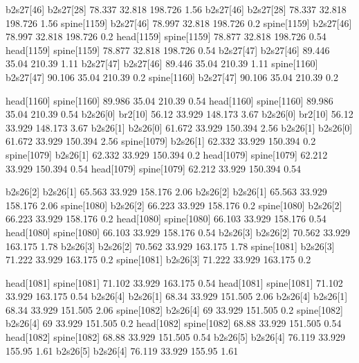 b2s27[46]    b2s27[28]    78.337    32.818    198.726    1.56
b2s27[46]    b2s27[28]    78.337    32.818    198.726    1.56
spine[1159]    b2s27[46]    78.997    32.818    198.726    0.2
spine[1159]    b2s27[46]    78.997    32.818    198.726    0.2
head[1159]    spine[1159]    78.877    32.818    198.726    0.54
head[1159]    spine[1159]    78.877    32.818    198.726    0.54
b2s27[47]    b2s27[46]    89.446    35.04    210.39    1.11
b2s27[47]    b2s27[46]    89.446    35.04    210.39    1.11
spine[1160]    b2s27[47]    90.106    35.04    210.39    0.2
spine[1160]    b2s27[47]    90.106    35.04    210.39    0.2


head[1160]    spine[1160]    89.986    35.04    210.39    0.54
head[1160]    spine[1160]    89.986    35.04    210.39    0.54
b2s26[0]    br2[10]    56.12    33.929    148.173    3.67
b2s26[0]    br2[10]    56.12    33.929    148.173    3.67
b2s26[1]    b2s26[0]    61.672    33.929    150.394    2.56
b2s26[1]    b2s26[0]    61.672    33.929    150.394    2.56
spine[1079]    b2s26[1]    62.332    33.929    150.394    0.2
spine[1079]    b2s26[1]    62.332    33.929    150.394    0.2
head[1079]    spine[1079]    62.212    33.929    150.394    0.54
head[1079]    spine[1079]    62.212    33.929    150.394    0.54


b2s26[2]    b2s26[1]    65.563    33.929    158.176    2.06
b2s26[2]    b2s26[1]    65.563    33.929    158.176    2.06
spine[1080]    b2s26[2]    66.223    33.929    158.176    0.2
spine[1080]    b2s26[2]    66.223    33.929    158.176    0.2
head[1080]    spine[1080]    66.103    33.929    158.176    0.54
head[1080]    spine[1080]    66.103    33.929    158.176    0.54
b2s26[3]    b2s26[2]    70.562    33.929    163.175    1.78
b2s26[3]    b2s26[2]    70.562    33.929    163.175    1.78
spine[1081]    b2s26[3]    71.222    33.929    163.175    0.2
spine[1081]    b2s26[3]    71.222    33.929    163.175    0.2


head[1081]    spine[1081]    71.102    33.929    163.175    0.54
head[1081]    spine[1081]    71.102    33.929    163.175    0.54
b2s26[4]    b2s26[1]    68.34    33.929    151.505    2.06
b2s26[4]    b2s26[1]    68.34    33.929    151.505    2.06
spine[1082]    b2s26[4]    69    33.929    151.505    0.2
spine[1082]    b2s26[4]    69    33.929    151.505    0.2
head[1082]    spine[1082]    68.88    33.929    151.505    0.54
head[1082]    spine[1082]    68.88    33.929    151.505    0.54
b2s26[5]    b2s26[4]    76.119    33.929    155.95    1.61
b2s26[5]    b2s26[4]    76.119    33.929    155.95    1.61


